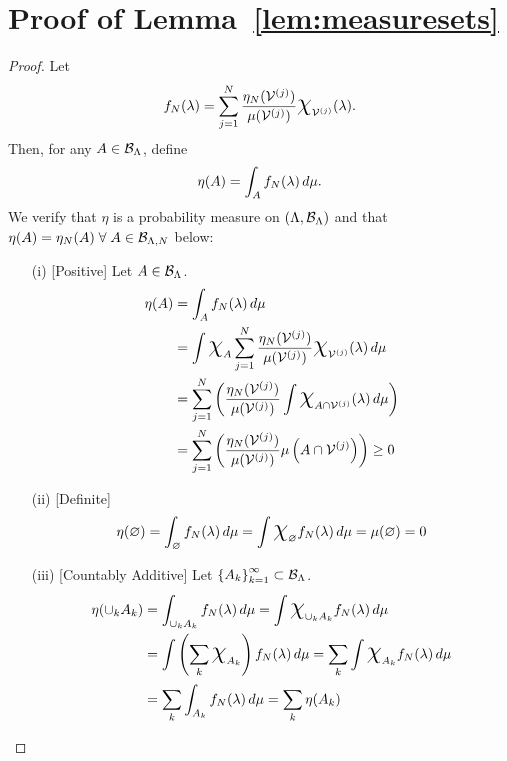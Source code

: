 \section{Proof of Lemma~\ref{lem:measuresets}}\label{app:measuresets}
\begin{proof}
Let
\begin{equation}\label{eq:finiteradon}
f_N (\param) = \sum_{j=1}^{N} \frac{\eta_N (\VV^{(j)}) }{\mu (\VV^{(j)})} \Chi_{\VV^{(j)}} (\param).
\end{equation}
Then, for any $A\in\mathcal{B}_{\Lambda}$, define
\begin{equation}\label{eq:approxmeasure}
\eta (A) = \int_A f_N (\lambda) \, d\mu.
\end{equation}
We verify that $\eta$ is a probability measure on $({\Lambda}, \mathcal{B}_{\Lambda})$ and that $\eta(A) = \eta_N(A) \; \forall \; A\in\mathcal{B}_{{\Lambda}, N}$ below:
\begin{itemize}
\item[(i)][Positive]
Let $A\in \mathcal{B}_{{\Lambda}}$.
\begin{equation*}
\begin{split}
\eta (A) &= \int_A f_N (\param) \, d\mu \\
&=  \int \Chi_A \sum_{j=1}^{N} \frac{\eta_N (\VV^{(j)}) }{\mu (\VV^{(j)})} \Chi_{\VV^{(j)}} (\param) \, d\mu \\
&= \sum_{j=1}^{N} \left ( \frac{\eta_N (\VV^{(j)}) }{\mu (\VV^{(j)})} \int \Chi_{A\cap\VV^{(j)}} (\param) \, d\mu \right ) \\
&= \sum_{j=1}^{N} \left ( \frac{\eta_N (\VV^{(j)}) }{\mu (\VV^{(j)})} \mu\left (A\cap\VV^{(j)}\right ) \right ) \geq 0
\end{split}
\end{equation*}

\item[(ii)][Definite]
\begin{equation*}
\eta (\nullset) = \int_\nullset f_N (\param) \, d\mu =\int \Chi_\nullset f_N (\param) \, d\mu = \mu(\nullset) = 0
\end{equation*}

\item[(iii)][Countably Additive]
Let $\left\{A_k\right\}_{k=1}^{\infty} \subset \mathcal{B}_{{\Lambda}}$.
\begin{equation*}
\begin{split}
\eta (\cup_k A_k) &= \int_{\cup_k A_k} f_N (\param) \, d\mu 
= \int \Chi_{\cup_k A_k} f_N (\param) \, d\mu \\
&= \int \left( \sum_k \Chi_{A_k} \right ) f_N (\param) \, d\mu
=   \sum_k \int \Chi_{A_k} f_N (\param) \, d\mu \\
&=   \sum_k \int_{A_k} f_N (\param) \, d\mu = \sum_k \eta(A_k)
\end{split}
\end{equation*}



\end{itemize}
\end{proof}
